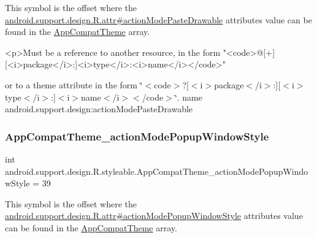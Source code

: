 This symbol is the offset where the \hyperlink{classandroid_1_1support_1_1design_1_1R_1_1attr_a116ae2612632257c3b1e67f63fa9fc63}{android.\+support.\+design.\+R.\+attr\#action\+Mode\+Paste\+Drawable} attribute\textquotesingle{}s value can be found in the \hyperlink{classandroid_1_1support_1_1design_1_1R_1_1styleable_afb351dc8de20cbd4c89abe360373010c}{App\+Compat\+Theme} array.

\begin{DoxyVerb}      <p>Must be a reference to another resource, in the form "<code>@[+][<i>package</i>:]<i>type</i>:<i>name</i></code>"
\end{DoxyVerb}
 or to a theme attribute in the form \char`\"{}$<$code$>$?\mbox{[}$<$i$>$package$<$/i$>$\+:\mbox{]}\mbox{[}$<$i$>$type$<$/i$>$\+:\mbox{]}$<$i$>$name$<$/i$>$$<$/code$>$\char`\"{}.  name android.\+support.\+design\+:action\+Mode\+Paste\+Drawable \mbox{\label{classandroid_1_1support_1_1design_1_1R_1_1styleable_af493b8a4fc8e112fffaddcdef4b737bb}} 
\subsubsection{\texorpdfstring{App\+Compat\+Theme\+\_\+action\+Mode\+Popup\+Window\+Style}{AppCompatTheme\_actionModePopupWindowStyle}}
{\footnotesize\ttfamily int android.\+support.\+design.\+R.\+styleable.\+App\+Compat\+Theme\+\_\+action\+Mode\+Popup\+Window\+Style = 39\hspace{0.3cm}{\ttfamily [static]}}

This symbol is the offset where the \hyperlink{classandroid_1_1support_1_1design_1_1R_1_1attr_a3d81e37de48707c92845af1664325cc2}{android.\+support.\+design.\+R.\+attr\#action\+Mode\+Popup\+Window\+Style} attribute\textquotesingle{}s value can be found in the \hyperlink{classandroid_1_1support_1_1design_1_1R_1_1styleable_afb351dc8de20cbd4c89abe360373010c}{App\+Compat\+Theme} array.

